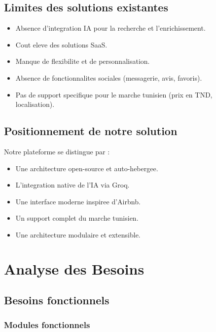 \documentclass[12pt,a4paper]{report}
\begin{document}
\section{Limites des solutions existantes}

\begin{itemize}
  \item Absence d'integration IA pour la recherche et l'enrichissement.
  \item Cout eleve des solutions SaaS.
  \item Manque de flexibilite et de personnalisation.
  \item Absence de fonctionnalites sociales (messagerie, avis, favoris).
  \item Pas de support specifique pour le marche tunisien (prix en TND, localisation).
\end{itemize}

\section{Positionnement de notre solution}

Notre plateforme se distingue par :
\begin{itemize}
  \item Une architecture open-source et auto-hebergee.
  \item L'integration native de l'IA via Groq.
  \item Une interface moderne inspiree d'Airbnb.
  \item Un support complet du marche tunisien.
  \item Une architecture modulaire et extensible.
\end{itemize}

\chapter{Analyse des Besoins}

\section{Besoins fonctionnels}

\subsection{Modules fonctionnels}
\end{document}
